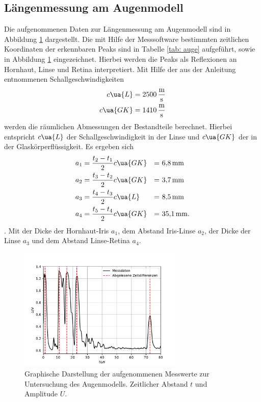 \subsection{Längenmessung am Augenmodell}
Die aufgenommenen Daten zur Längenmessung am Augenmodell sind in Abbildung \ref{fig: auge} dargestellt. Die mit Hilfe
der Messsoftware bestimmten zeitlichen Koordinaten der erkennbaren Peaks sind in Tabelle \ref{tab: auge} aufgeführt, sowie in Abbildung
\ref{fig: auge} eingezeichnet. Hierbei werden die Peaks als Reflexionen an Hornhaut, Linse und Retina interpretiert. %
Mit Hilfe der aus der Anleitung \cite{anleitungus1} entnommenen Schallgeschwindigkeiten
\begin{align}
  \begin{aligned}
    c\ua{L} &= \SI{2500}{\meter\per\second}\\
    c\ua{GK}&= \SI{1410}{\meter\per\second}
  \end{aligned}
\end{align}
werden die räumlichen Abmessungen der Bestandteile berechnet. Hierbei entspricht $c\ua{L}$ der Schallgeschwindigkeit
in der Linse und $c\ua{GK}$ der in der Glaskörperflüssigkeit. Es ergeben sich
\begin{align}
  \begin{aligned}
a_1 &= \frac{t_2 - t_1}{2} c\ua{GK} &=&\,\, \SI[]{6.8}{\milli\meter} \\
a_2 &= \frac{t_3 - t_2}{2} c\ua{GK} &=&\,\, \SI[]{3.7}{\milli\meter}\\
a_3 &= \frac{t_4 - t_3}{2} c\ua{L}  &=&\,\, \SI[]{8.5}{\milli\meter}\\
a_4 &= \frac{t_5 - t_4}{2} c\ua{GK} &=&\,\,\SI[]{35.1}{\milli\meter}.
\end{aligned}
\end{align} .
Mit der Dicke der Hornhaut-Iris $a_1$, dem Abstand Iris-Linse $a_2$,
der Dicke der Linse $a_3$ und dem Abstand Linse-Retina $a_4$.

\begin{figure}[H]
  \centering
  \includegraphics[width = 0.7\textwidth]{../Messdaten/plots/auge.pdf}
  \caption{Graphische Darstellung der aufgenommenen Messwerte zur Untersuchung des Augenmodells. Zeitlicher Abstand $t$ und Amplitude $U$.}
  \label{fig: auge}
\end{figure}
